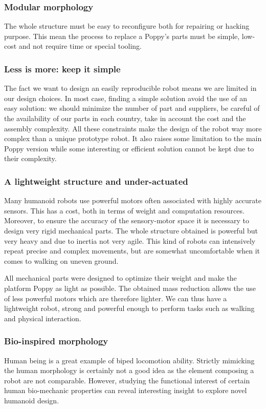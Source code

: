 \subsubsection{Modular morphology} %
The whole structure must be easy to reconfigure both for repairing or hacking purpose. This mean the process to replace a Poppy's parts must be simple, low-cost and not require time or special tooling.


\subsubsection{Less is more: keep it simple}

The fact we want to design an easily reproducible robot means we are limited in our design choices.
In most case, finding a simple solution avoid the use of an easy solution: we should minimize the number of part and suppliers, be careful of the availability of our parts in each country, take in account the cost and the assembly complexity.
All these constraints make the design of the robot way more complex than a unique prototype robot.
It also raises some limitation to the main Poppy version while some interesting or efficient solution cannot be kept due to their complexity.


\subsubsection{A lightweight structure and under-actuated} %

Many humanoid robots use powerful motors often associated with highly accurate sensors.
This has a cost, both in terms of weight and computation resources.
Moreover, to ensure the accuracy of the sensory-motor space it is necessary to design very rigid mechanical parts.
The whole structure obtained is powerful but very heavy and due to inertia not very agile.
This kind of robots can intensively repeat precise and complex movements, but are somewhat uncomfortable when it comes to walking on uneven ground.

All mechanical parts were designed to optimize their weight and make the platform Poppy as light as possible.
The obtained mass reduction allows the use of less powerful motors which are therefore lighter.
We can thus have a lightweight robot, strong and powerful enough to perform tasks such as walking and physical interaction.


\subsubsection{Bio-inspired morphology} %
Human being is a great example of biped locomotion ability.
Strictly mimicking the human morphology is certainly not a good idea as the element composing a robot are not comparable.
However, studying the functional interest of certain human bio-mechanic properties can reveal interesting insight to explore novel humanoid design.


